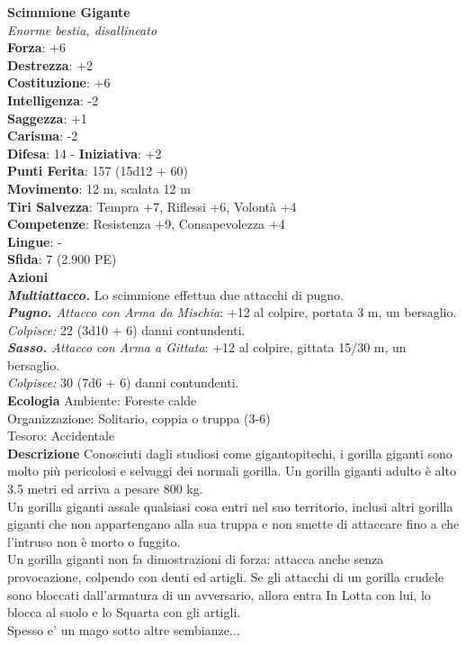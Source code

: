 \begin{multicols}{2}
\medskip\textbf{Scimmione Gigante}\\
\emph{Enorme bestia, disallineato}\\
\textbf{Forza}: +6\\
\textbf{Destrezza}: +2\\
\textbf{Costituzione}: +6\\
\textbf{Intelligenza}: -2\\
\textbf{Saggezza}: +1\\
\textbf{Carisma}: -2\\
\textbf{Difesa}: 14 - \textbf{Iniziativa}: +2\\
\textbf{Punti Ferita}: 157 (15d12 + 60)\\
\textbf{Movimento}: 12 m, scalata 12 m\\
\textbf{Tiri Salvezza}: Tempra +7, Riflessi +6, Volontà +4\\
\textbf{Competenze}: Resistenza +9, Consapevolezza +4\\
\textbf{Lingue}: -\\
\textbf{Sfida}: 7 (2.900 PE)\smallskip\\
\smallskip\textbf{Azioni}\\
\emph{\textbf{Multiattacco.}} Lo scimmione effettua due attacchi di pugno.\\
\emph{\textbf{Pugno.} Attacco con Arma da Mischia}: +12 al colpire, portata 3 m, un bersaglio.\\
\emph{Colpisce:} 22 (3d10 + 6) danni contundenti. \\
\emph{\textbf{Sasso.} Attacco con Arma a Gittata}: +12 al colpire, gittata 15/30 m, un bersaglio.\\
\emph{Colpisce:} 30 (7d6 + 6) danni contundenti.\\
\textbf{Ecologia}
Ambiente: Foreste calde\\
Organizzazione: Solitario, coppia o truppa (3-6)\\
Tesoro: Accidentale\\
\textbf{Descrizione}
Conosciuti dagli studiosi come gigantopitechi, i gorilla giganti sono molto più pericolosi e selvaggi dei normali gorilla. Un gorilla giganti adulto è alto 3.5 metri ed arriva a pesare 800 kg.\\
Un gorilla giganti assale qualsiasi cosa entri nel suo territorio, inclusi altri gorilla giganti che non appartengano alla sua truppa e non smette di attaccare fino a che l'intruso non è morto o fuggito.\\
Un gorilla giganti non fa dimostrazioni di forza: attacca anche senza provocazione, colpendo con denti ed artigli. Se gli attacchi di un gorilla crudele sono bloccati dall'armatura di un avversario, allora entra In Lotta con lui, lo blocca al suolo e lo Squarta con gli artigli.\\
Spesso e' un mago sotto altre sembianze...\\



\end{multicols}

